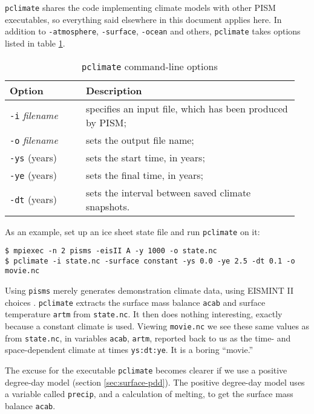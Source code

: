 \documentclass[titlepage,letterpaper,final]{scrartcl}
\newcommand{\txtopt}[2]{\texttt{-#1} #2\optindex{\texttt{-#1} #2}}
\newcommand{\fileopt}[1]{\txtopt{#1}{\emph{filename}}}
\begin{document}
\texttt{pclimate} shares the code implementing climate models with other PISM
executables, so everything said elsewhere in this document  applies
here. In addition to \texttt{-atmosphere}, \texttt{-surface}, \texttt{-ocean}
and others, \texttt{pclimate} takes options listed in table \ref{tab:pclimate}.

\begin{table}[ht]
  \centering
  \caption{\texttt{pclimate} command-line options}
  \begin{tabular}{p{0.25\linewidth}p{0.7\linewidth}}\toprule
    \textbf{Option} & \textbf{Description}\\
    \midrule
    \fileopt{i} & specifies an input file, which has been produced by PISM;\\
    \fileopt{o} & sets the output file name;\\
    \txtopt{ys}{(years)} & sets the start time, in years;\\
    \txtopt{ye}{(years)} & sets the final time, in years;\\
    \txtopt{dt}{(years)} & sets the interval between saved climate snapshots.\\
    \bottomrule
 \end{tabular}
 \label{tab:pclimate}
\end{table}

\bigskip
As an example, set up an ice sheet state file and run \texttt{pclimate} on it:
\begin{verbatim}
$ mpiexec -n 2 pisms -eisII A -y 1000 -o state.nc
$ pclimate -i state.nc -surface constant -ys 0.0 -ye 2.5 -dt 0.1 -o movie.nc
\end{verbatim}
Using \texttt{pisms} merely generates demonstration climate data, using
EISMINT II choices \cite{EISMINT00}.  \texttt{pclimate} extracts the 
surface mass balance \texttt{acab} and surface temperature \texttt{artm} from \texttt{state.nc}.
It then does nothing interesting, exactly because a constant climate
is used.  Viewing \texttt{movie.nc} we see these same values as from \texttt{state.nc},
in variables \texttt{acab}, \texttt{artm}, reported back to us as the time- and space-dependent
climate at times \texttt{ys:dt:ye}.  It is a boring ``movie.''

The excuse for the executable \texttt{pclimate} becomes clearer if we use a positive degree-day
model (section \ref{sec:surface-pdd}).  The positive degree-day
model uses a variable called \texttt{precip}, and a calculation of melting, to get the
surface mass balance \texttt{acab}.
\end{document}
